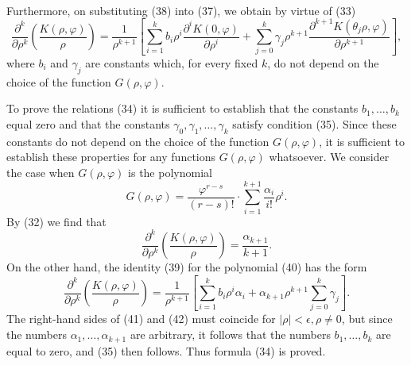 \documentclass[10pt,a5paper]{book}
\makeatletter
\theoremstyle{plain}
\theoremstyle{definition}
\theoremstyle{remark}
\renewenvironment{proof}[1][\proofname]{\par
  \pushQED{\qed}%
  \normalfont\topsep6\p@\@plus6\p@\relax
  \trivlist
  \item\relax{\itshape #1\@addpunct{.}}\hspace\labelsep\ignorespaces
}{\popQED\endtrivlist\@endpefalse}
\makeatother
\begin{document}
\begin{proof}
\begin{align*}
\end{align*}
Furthermore, on substituting (38) into (37), we obtain by virtue of (33)
\begin{equation*}
\frac{\partial^{k}}{\partial \rho^{k}}\left(\frac{K(\rho, \varphi)}{\rho}\right)=\frac{1}{\rho^{k+1}}\left[\sum_{i=1}^{k} b_{i} \rho^{i} \frac{\partial^{i} K(0, \varphi)}{\partial \rho^{i}}+\sum_{j=0}^{k} \gamma_{j} \rho^{k+1} \frac{\partial^{k+1} K\left(\theta_{j} \rho, \varphi\right)}{\partial \rho^{k+1}}\right], \tag{39}
\end{equation*}
where $b_{i}$ and $\gamma_{j}$ are constants which, for every fixed $k$, do not depend on the choice of the function $G(\rho, \varphi)$.

To prove the relations (34) it is sufficient to establish that the constants $b_{1}, \ldots, b_{k}$ equal zero and that the constants $\gamma_{0}, \gamma_{1}, \ldots, \gamma_{k}$ satisfy condition (35). Since these constants do not depend on the choice of the function $G(\rho, \varphi)$, it is sufficient to establish these properties for any functions $G(\rho, \varphi)$ whatsoever. We consider the case when $G(\rho, \varphi)$ is the polynomial
\begin{equation*}
G(\rho, \varphi)=\frac{\varphi^{r-s}}{(r-s)!} \cdot \sum_{i=1}^{k+1} \frac{\alpha_{i}}{i!} \rho^{i} . \tag{40}
\end{equation*}
By (32) we find that
\begin{equation*}
\frac{\partial^{k}}{\partial \rho^{k}}\left(\frac{K(\rho, \varphi)}{\rho}\right)=\frac{\alpha_{k+1}}{k+1} . \tag{41}
\end{equation*}
On the other hand, the identity (39) for the polynomial (40) has the form
\begin{equation*}
\frac{\partial^{k}}{\partial \rho^{k}}\left(\frac{K(\rho, \varphi)}{\rho}\right)=\frac{1}{\rho^{k+1}}\left[\sum_{i=1}^{k} b_{i} \rho^{i} \alpha_{i}+\alpha_{k+1} \rho^{k+1} \sum_{j=0}^{k} \gamma_{j}\right] . \tag{42}
\end{equation*}
The right-hand sides of (41) and (42) must coincide for $|\rho|<\epsilon, \rho \neq 0$, but since the numbers $\alpha_{1}, \ldots, \alpha_{k+1}$ are arbitrary, it follows that the numbers $b_{1}, \ldots, b_{k}$ are equal to zero, and (35) then follows. Thus formula (34) is proved.


\end{proof}
\end{document}
